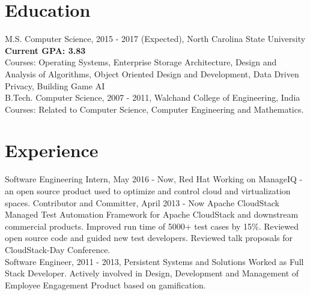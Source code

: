 \documentclass[]{friggeri-cv}
\begin{document}
\section{Education}
\begin{entrylist}
  \entry
    {M.S. Computer Science, 2015 - 2017 (Expected),}
    {North Carolina State University}
    {\textbf{Current GPA: 3.83}\\Courses: Operating Systems, Enterprise Storage Architecture, Design and Analysis of Algorithms, Object Oriented Design and Development, Data Driven Privacy, Building Game AI\\}
  \entry
    {B.Tech. Computer Science, 2007 - 2011,}
    {Walchand College of Engineering, India}
    {Courses: Related to Computer Science, Computer Engineering and Mathematics.\\}
\end{entrylist}
\section{Experience}
\begin{entrylist}
  \entry
    {Software Engineering Intern, May 2016 - Now,}
    {Red Hat}
    {Working on ManageIQ - an open source product used to optimize and control cloud and virtualization spaces.\newline}
  \entry
    {Contributor and Committer, April 2013 - Now}
    {Apache CloudStack}
    {Managed Test Automation Framework for Apache CloudStack and downstream commercial products. Improved run time of 5000+ test cases by 15\%. Reviewed open source code and guided new test developers. Reviewed talk proposals for CloudStack-Day Conference.\\}
    \entry
    {Software Engineer, 2011 - 2013,}
    {Persistent Systems and Solutions}
    {Worked as Full Stack Developer. Actively involved in Design, Development and Management of Employee Engagement Product based on gamification.\\}
\end{entrylist}
\end{document}
